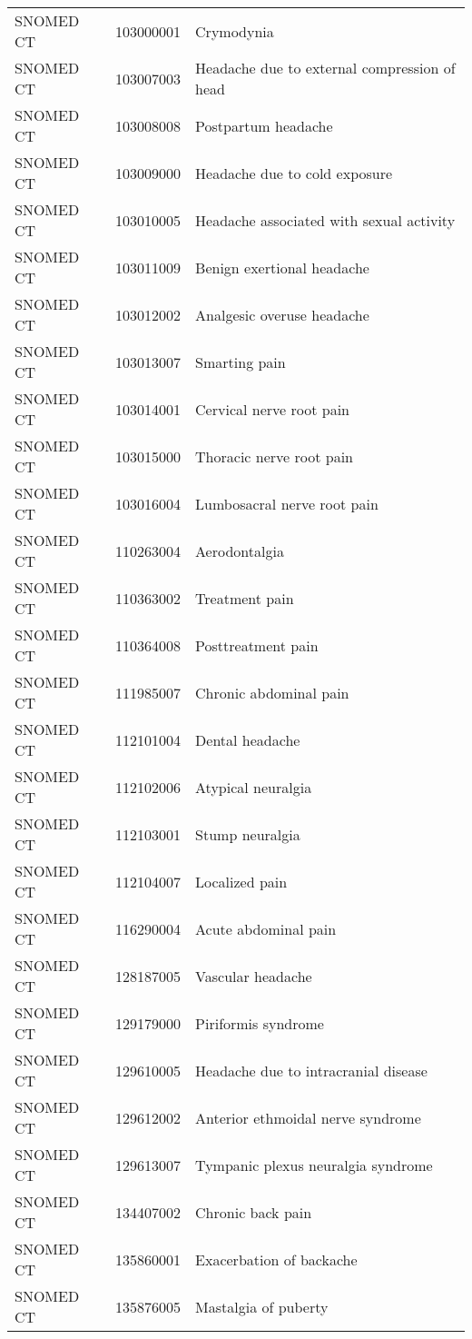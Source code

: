 \begin{longtable}{p{}p{}p{}}
  SNOMED CT & 103000001 & Crymodynia \\ 
  SNOMED CT & 103007003 & Headache due to external compression of head \\ 
  SNOMED CT & 103008008 & Postpartum headache \\ 
  SNOMED CT & 103009000 & Headache due to cold exposure \\ 
  SNOMED CT & 103010005 & Headache associated with sexual activity \\ 
  SNOMED CT & 103011009 & Benign exertional headache \\ 
  SNOMED CT & 103012002 & Analgesic overuse headache \\ 
  SNOMED CT & 103013007 & Smarting pain \\ 
  SNOMED CT & 103014001 & Cervical nerve root pain \\ 
  SNOMED CT & 103015000 & Thoracic nerve root pain \\ 
  SNOMED CT & 103016004 & Lumbosacral nerve root pain \\ 
  SNOMED CT & 110263004 & Aerodontalgia \\ 
  SNOMED CT & 110363002 & Treatment pain \\ 
  SNOMED CT & 110364008 & Posttreatment pain \\ 
  SNOMED CT & 111985007 & Chronic abdominal pain \\ 
  SNOMED CT & 112101004 & Dental headache \\ 
  SNOMED CT & 112102006 & Atypical neuralgia \\ 
  SNOMED CT & 112103001 & Stump neuralgia \\ 
  SNOMED CT & 112104007 & Localized pain \\ 
  SNOMED CT & 116290004 & Acute abdominal pain \\ 
  SNOMED CT & 128187005 & Vascular headache \\ 
  SNOMED CT & 129179000 & Piriformis syndrome \\ 
  SNOMED CT & 129610005 & Headache due to intracranial disease \\ 
  SNOMED CT & 129612002 & Anterior ethmoidal nerve syndrome \\ 
  SNOMED CT & 129613007 & Tympanic plexus neuralgia syndrome \\ 
  SNOMED CT & 134407002 & Chronic back pain \\ 
  SNOMED CT & 135860001 & Exacerbation of backache \\ 
  SNOMED CT & 135876005 & Mastalgia of puberty \\ 

\end{longtable}
